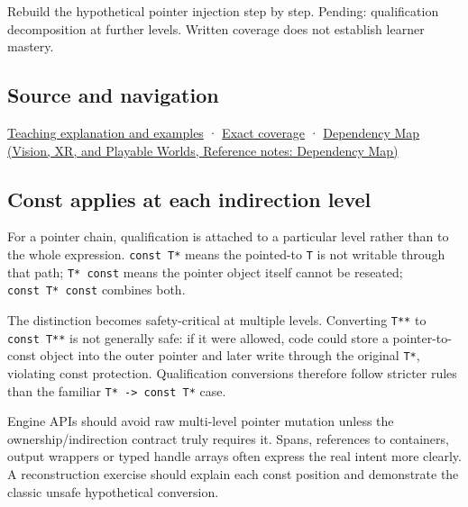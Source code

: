 Rebuild the hypothetical pointer injection step by step. Pending: qualification decomposition at further levels. Written coverage does not establish learner mastery.

\subsection{Source and navigation}\label{appendix-5e1a7561cd98-source-and-navigation}

\hyperref[01-foundations-i-ch003-read-only-is-a-path-not-an-ownership-or-synchronization-promise]{Teaching explanation and examples} · \hyperref[appendix-fd090d982a15-m008---parts-113-126]{Exact coverage} · \href{../07-Vision-XR-and-Playable-Worlds/main.pdf\#nameddest=appendix-4ad47bdd269a}{Dependency Map (Vision, XR, and Playable Worlds, Reference notes: Dependency Map)}

\subsection{Const applies at each indirection level}\label{appendix-5e1a7561cd98-const-applies-at-each-indirection-level}

For a pointer chain, qualification is attached to a particular level rather than to the whole expression. \texttt{const\ T*} means the pointed-to \texttt{T} is not writable through that path; \texttt{T*\ const} means the pointer object itself cannot be reseated; \texttt{const\ T*\ const} combines both.

The distinction becomes safety-critical at multiple levels. Converting \texttt{T**} to \texttt{const\ T**} is not generally safe: if it were allowed, code could store a pointer-to-const object into the outer pointer and later write through the original \texttt{T*}, violating const protection. Qualification conversions therefore follow stricter rules than the familiar \texttt{T*\ -\textgreater{}\ const\ T*} case.

Engine APIs should avoid raw multi-level pointer mutation unless the ownership/indirection contract truly requires it. Spans, references to containers, output wrappers or typed handle arrays often express the real intent more clearly. A reconstruction exercise should explain each const position and demonstrate the classic unsafe hypothetical conversion.
